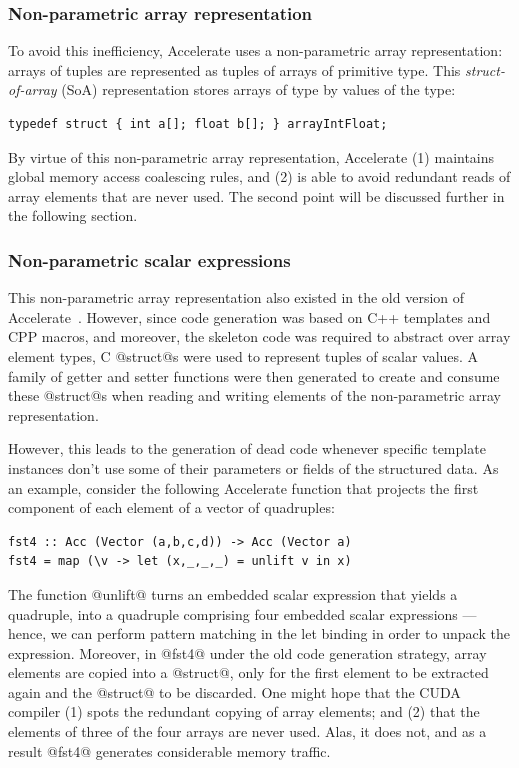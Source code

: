 \subsubsection{Non-parametric array representation}

To avoid this inefficiency, Accelerate uses a non-parametric array
representation: arrays of tuples are represented as tuples of arrays of
primitive type. This \emph{struct-of-array}
(SoA) representation
stores arrays of type  by values of the type:
%
\begin{lstlisting}[style=cuda]
typedef struct { int a[]; float b[]; } arrayIntFloat;
\end{lstlisting}
%
By virtue of this non-parametric array representation, Accelerate (1) maintains
global memory access coalescing rules, and (2) is able to avoid redundant reads
of array elements that are never used. The second point will be discussed
further in the following section.

\subsubsection{Non-parametric scalar expressions}

This non-parametric array representation also existed in the old version of
Accelerate~\cite{Chakravarty:2011fr}. However, since code generation was based
on C++ templates and CPP macros, and moreover, the skeleton code was required to
abstract over array element types, C @struct@s were used to represent
tuples of scalar values. A family of getter and setter functions were then
generated to create and consume these @struct@s when reading and writing
elements of the non-parametric array representation.

However, this leads to the generation of dead code whenever specific template
instances don't use some of their parameters or fields of the structured data.
As an example, consider the following Accelerate function that projects the
first component of each element of a vector of quadruples:
%
\begin{lstlisting}[style=haskell]
fst4 :: Acc (Vector (a,b,c,d)) -> Acc (Vector a)
fst4 = map (\v -> let (x,_,_,_) = unlift v in x)
\end{lstlisting}
%
The function @unlift@ turns an embedded scalar expression that yields a
quadruple, into a quadruple comprising four embedded scalar expressions ---
hence, we can perform pattern matching in the let binding in order to unpack the
expression. Moreover, in @fst4@ under the old code generation strategy,
array elements are copied into a @struct@, only for the first element to be
extracted again and the @struct@ to be discarded. One might hope that the
CUDA compiler (1) spots the redundant copying of array elements; and (2) that
the elements of three of the four arrays are never used. Alas, it does not, and
as a result @fst4@ generates considerable memory traffic.

